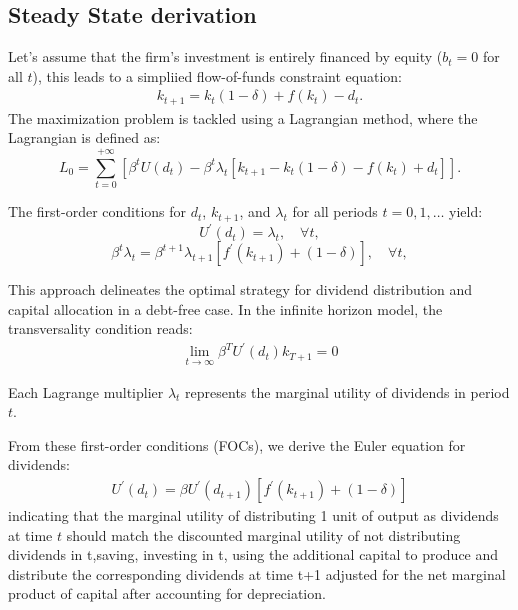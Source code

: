 \documentclass[12pt]{report}
\begin{document}
\subsection{Steady State derivation}
Let's assume that the firm's investment is entirely financed by equity (\(b_t=0\)  for all \(t\)), this leads to a simpliied flow-of-funds constraint equation:
\begin{align}
    k_{t+1} = k_{t}(1 - \delta) + f(k_{t}) - d_{t}.  \label{eq13}
\end{align}
The maximization problem is tackled using a Lagrangian method, where the Lagrangian is defined as:
\[L_0 = \sum_{t=0}^{+\infty}\left[{\beta^t U(d_t) - \beta^t \lambda_t\left[k_{t+1} - k_{t}(1 - \delta) - f(k_t) + d_t\right]}\right].\]

The first-order conditions for \(d_{t}\), \(k_{t+1}\), and \(\lambda_t\) for all periods \(t=0,1,\ldots\) yield:
\[
U^{\prime}(d_{t}) = \lambda_t, \quad \forall t,
\]
\[
\beta^t \lambda_t = \beta^{t+1} \lambda_{t+1}[f^{\prime}(k_{t+1}) + (1-\delta)], \quad \forall t,
\]


This approach delineates the optimal strategy for dividend distribution and capital allocation in a debt-free
case.
In the infinite horizon model, the transversality condition reads:
\begin{align}
    \lim _{t \rightarrow \infty} \beta^T U^{\prime}\left(d_{t}\right) k_{T+1}=0 \label{eq26}
\end{align}




Each Lagrange multiplier \(\lambda_t\) represents the marginal utility of dividends in period \(t\). 

From these first-order conditions (FOCs), we derive the Euler equation for dividends:
\begin{align}
    U^{\prime}(d_{t}) = \beta U^{\prime}(d_{t+1})[f^{\prime}(k_{t+1}) + (1-\delta)]  \label{eq14}
\end{align}
indicating that the marginal utility of distributing 1 unit of output as dividends at time \(t\) should match the discounted marginal
utility of not distributing  dividends in t,saving, investing in t, using the additional capital to produce and
distribute the corresponding dividends at time t+1 adjusted for the net marginal product of capital after accounting
for depreciation.
\end{document}
